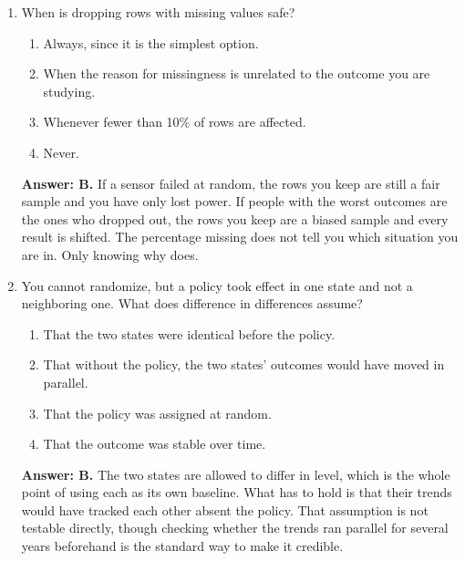 \documentclass[11pt]{article}
\begin{document}
\begin{enumerate}[itemsep=14pt]
\item When is dropping rows with missing values safe?

\begin{enumerate}[label=\Alph*., itemsep=1pt, topsep=3pt]
  \item Always, since it is the simplest option.
  \item When the reason for missingness is unrelated to the outcome you are studying.
  \item Whenever fewer than 10\% of rows are affected.
  \item Never.
\end{enumerate}

\vspace{2pt}
\textbf{Answer: B.} If a sensor failed at random, the rows you keep are still a fair sample and you have only lost power. If people with the worst outcomes are the ones who dropped out, the rows you keep are a biased sample and every result is shifted. The percentage missing does not tell you which situation you are in. Only knowing why does.
\vspace{4pt}

\item You cannot randomize, but a policy took effect in one state and not a neighboring one. What does difference in differences assume?

\begin{enumerate}[label=\Alph*., itemsep=1pt, topsep=3pt]
  \item That the two states were identical before the policy.
  \item That without the policy, the two states' outcomes would have moved in parallel.
  \item That the policy was assigned at random.
  \item That the outcome was stable over time.
\end{enumerate}

\vspace{2pt}
\textbf{Answer: B.} The two states are allowed to differ in level, which is the whole point of using each as its own baseline. What has to hold is that their trends would have tracked each other absent the policy. That assumption is not testable directly, though checking whether the trends ran parallel for several years beforehand is the standard way to make it credible.
\vspace{4pt}

\end{enumerate}
\end{document}
